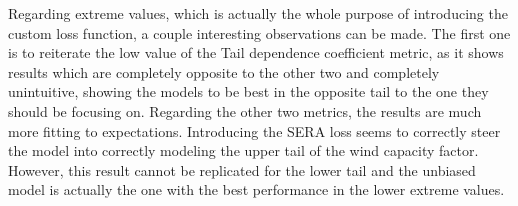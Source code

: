 Regarding extreme values, which is actually the whole purpose of introducing the custom loss function, a couple interesting observations can be made. The first one is to reiterate the low value of the Tail dependence coefficient metric, as it shows results which are completely opposite to the other two and completely unintuitive, showing the models to be best in the opposite tail to the one they should be focusing on. Regarding the other two metrics, the results are much more fitting to expectations. Introducing the SERA loss seems to correctly steer the model into correctly modeling the upper tail of the wind capacity factor. However, this result cannot be replicated for the lower tail and the unbiased model is actually the one with the best performance in the lower extreme values. 